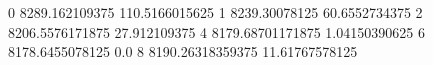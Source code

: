 0 8289.162109375 110.5166015625
1 8239.30078125 60.6552734375
2 8206.5576171875 27.912109375
4 8179.68701171875 1.04150390625
6 8178.6455078125 0.0
8 8190.26318359375 11.61767578125
